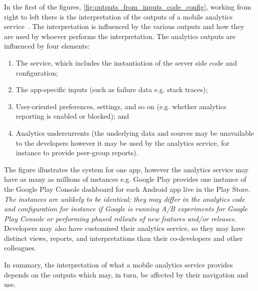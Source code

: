 In the first of the figures, \ref{fig:outputs_from_inputs_code_config}, working from right to left there is the interpretation of the outputs of a mobile analytics service~. The interpretation is influenced by the various outputs and how they are used by whoever performs the interpretation. The analytics outputs are influenced by four elements: 
\begin{enumerate}
    \itemsep0em
    \item The service, which includes the instantiation of the server side code and configuration; 
    \item The app-specific inputs (such as failure data e.g. stack traces); 
    \item User-oriented preferences, settings, and so on (e.g. whether analytics reporting is enabled or blocked); and 
    \item Analytics undercurrents (the underlying data and sources may be unavailable to the developers however it may be used by the analytics service, for instance to provide peer-group reports).
\end{enumerate}

The figure illustrates the system for one app, however the analytics service may have as many as millions of instances e.g. Google Play provides one instance of the Google Play Console dashboard for each Android app live in the Play Store. \emph{The instances are unlikely to be identical; they may differ in the analytics code and configuration for instance if Google is running A/B experiments for Google Play Console or performing phased rollouts of new features and/or releases.} Developers may also have customised their analytics service, so they may have distinct views, reports, and interpretations than their co-developers and other colleagues.

In summary, the interpretation of what a mobile analytics service provides depends on the outputs which may, in turn, be affected by their navigation and use. 

